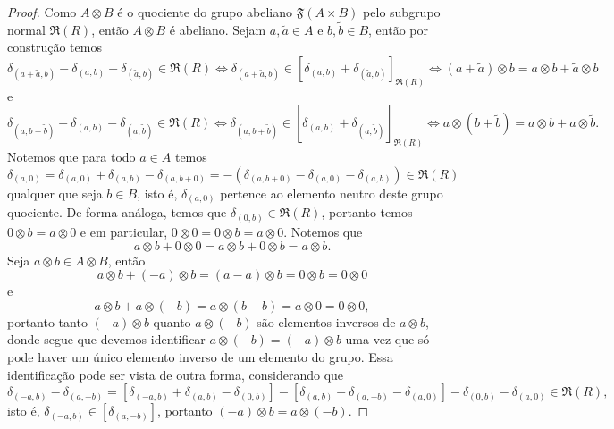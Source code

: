 \begin{proof}
    Como \(A\otimes B\) é o quociente do grupo abeliano \(\mathfrak{F}(A \times B)\) pelo subgrupo normal \(\mathfrak{R}(R)\), então \(A \otimes B\) é abeliano. Sejam \(a, \tilde{a} \in A\) e \(b, \tilde{b} \in B\), então por construção temos
    \begin{equation*}
        \delta_{(a + \tilde{a}, b)} - \delta_{(a,b)} - \delta_{(\tilde{a}, b)} \in \mathfrak{R}(R) \iff \delta_{(a + \tilde{a}, b)} \in [\delta_{(a,b)} + \delta_{(\tilde{a},b)}]_{\mathfrak{R}(R)} \iff (a + \tilde{a})\otimes b = a\otimes b + \tilde{a} \otimes b
    \end{equation*}
    e
    \begin{equation*}
        \delta_{(a, b + \tilde{b})} - \delta_{(a,b)} - \delta_{(a, \tilde{b})} \in \mathfrak{R}(R) \iff \delta_{(a, b + \tilde{b})} \in [\delta_{(a,b)} + \delta_{(a, \tilde{b})}]_{\mathfrak{R}(R)} \iff a\otimes (b+\tilde{b}) = a\otimes b + a \otimes \tilde{b}.
    \end{equation*}
    Notemos que para todo \(a \in A\) temos
    \begin{equation*}
        \delta_{(a, 0)} = \delta_{(a, 0)} + \delta_{(a, b)} - \delta_{(a, b + 0)} = -\left(\delta_{(a,b + 0)} - \delta_{(a,0)} - \delta_{(a,b)}\right) \in \mathfrak{R}(R)
    \end{equation*}
    qualquer que seja \(b \in B\), isto é, \(\delta_{(a,0)}\) pertence ao elemento neutro deste grupo quociente. De forma análoga, temos que \(\delta_{(0,b)} \in \mathfrak{R}(R)\), portanto temos \(0 \otimes b = a \otimes 0\) e em particular, \(0 \otimes 0 = 0 \otimes b = a \otimes 0\). Notemos que
    \begin{equation*}
        a \otimes b + 0 \otimes 0 = a \otimes b + 0 \otimes b = a \otimes b.
    \end{equation*}
    Seja \(a \otimes b \in A \otimes B\), então
    \begin{equation*}
        a \otimes b + (-a) \otimes b = (a - a) \otimes b = 0 \otimes b = 0\otimes 0
    \end{equation*}
    e
    \begin{equation*}
        a \otimes b + a \otimes (-b) = a \otimes (b - b) = a \otimes 0 = 0 \otimes 0,
    \end{equation*}
    portanto tanto \((-a) \otimes b\) quanto \(a \otimes (-b)\) são elementos inversos de \(a \otimes b\), donde segue que devemos identificar \(a \otimes (-b) = (-a)\otimes b\) uma vez que só pode haver um único elemento inverso de um elemento do grupo. Essa identificação pode ser vista de outra forma, considerando que
    \begin{equation*}
        \delta_{(-a, b)} - \delta_{(a, -b)} = \left[\delta_{(-a, b)} + \delta_{(a,b)} - \delta_{(0,b)}\right] - \left[\delta_{(a,b)} + \delta_{(a, -b)} - \delta_{(a,0)}\right] - \delta_{(0,b)} - \delta_{(a, 0)} \in \mathfrak{R}(R),
    \end{equation*}
    isto é, \(\delta_{(-a, b)} \in [\delta_{(a, -b)}]\), portanto \((-a)\otimes b = a\otimes(-b)\).


\end{proof}
